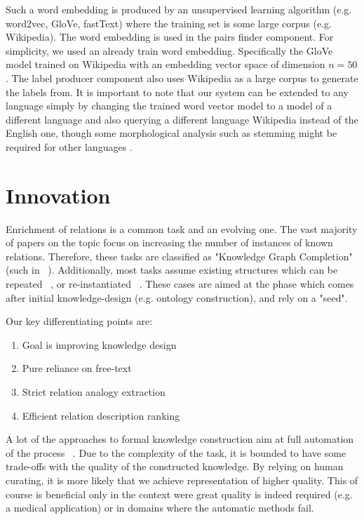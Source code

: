 \documentclass[11pt,a4paper]{article}
\begin{document}
Such a word embedding is produced by an unsupervised learning algorithm (e.g. word2vec, GloVe, fastText) where the training set is some large corpus (e.g. Wikipedia).
The word embedding is used in the pairs finder component. For simplicity, we used an already train word embedding. Specifically the GloVe model trained 
on Wikipedia with an embedding vector space of dimension $n=50$. The label producer component also uses Wikipedia as a large corpus to generate the 
labels from. It is important to note that our system can be extended to any language simply by changing the trained word vector model to a model 
of a different language and also querying a different language Wikipedia instead of the English one, though some morphological analysis such as 
stemming might be required for other languages \cite{cotterell2015morphological}.

\section{Innovation}
Enrichment of relations is a common task and an evolving one. The vast majority of papers on the topic focus on increasing the number of instances of known relations. Therefore, these tasks are classified as "Knowledge Graph Completion" (such in ~\cite{wang2014knowledge}). Additionally, most tasks assume existing structures which can be repeated ~\cite{ferragina2012fast}, or re-instantiated ~\cite{xie2016representation}. These cases are aimed at the phase which comes after initial knowledge-design (e.g. ontology construction), and rely on a "seed".

Our key differentiating points are:
\begin{enumerate}
\item Goal is improving knowledge design
\item Pure reliance on free-text
\item Strict relation analogy extraction
\item Efficient relation description ranking
\end{enumerate}

A lot of the approaches to formal knowledge construction aim at full automation of the process ~\cite{maedche2001ontology}. Due to the complexity of the task, it is bounded to have some trade-offs with the quality of the constructed knowledge. By relying on human curating, it is more likely that we achieve representation of higher quality. This of course is beneficial only in the context were great quality is indeed required (e.g. a medical application) or in domains where the automatic methods fail.
\end{document}
